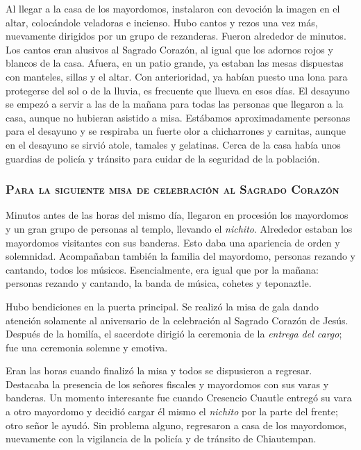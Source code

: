 \documentclass[14pt,letterpaper,twoside]{extbook} %
\begin{document}
Al llegar a la casa de los mayordomos, instalaron con devoción la imagen en el altar, colocándole veladoras e incienso. Hubo cantos y rezos una vez más, nuevamente dirigidos por un grupo de rezanderas. Fueron alrededor de  minutos. Los cantos eran alusivos al Sagrado Corazón, al igual que los adornos rojos y blancos de la casa. Afuera, en un patio grande, ya estaban las mesas dispuestas con manteles, sillas y el altar. Con anterioridad, ya habían puesto una lona para protegerse del sol o de la lluvia, es frecuente que llueva en esos días. El desayuno se empezó a servir a las  de la mañana para todas las personas que llegaron a la casa, aunque no hubieran asistido a misa. Estábamos aproximadamente  personas para el desayuno y se respiraba un fuerte olor a chicharrones y carnitas, aunque en el desayuno se sirvió atole, tamales y gelatinas. Cerca de la casa había unos guardias de policía y tránsito para cuidar de la seguridad de la población.

\subsubsection{\mdseries\textsc{Para la siguiente misa de celebración al Sagrado Corazón}}

\noindent Minutos antes de las  horas del mismo día, llegaron en procesión los mayordomos y un gran grupo de personas al templo, llevando el \textit{nichito}. Alrededor estaban los mayordomos visitantes con sus banderas. Esto daba una apariencia de orden y solemnidad. Acompañaban también la familia del mayordomo, personas rezando y cantando, todos los músicos. Esencialmente, era igual que por la mañana: personas rezando y cantando, la banda de música, cohetes y teponaztle.

Hubo bendiciones en la puerta principal. Se realizó la misa de gala dando atención solamente al aniversario de la celebración al Sagrado Corazón de Jesús. Después de la homilía, el sacerdote dirigió la ceremonia de la \textit{entrega del cargo}; fue una ceremonia solemne y emotiva.

Eran las  horas cuando finalizó la misa y todos se dispusieron a regresar. Destacaba la presencia de los señores fiscales y mayordomos con sus varas y banderas. Un momento interesante fue cuando Cresencio Cuautle entregó su vara a otro mayordomo y decidió cargar él mismo el \textit{nichito} por la parte del frente; otro señor le ayudó. Sin problema alguno, regresaron a casa de los mayordomos, nuevamente con la vigilancia de la policía y de tránsito de Chiautempan.
\end{document}
